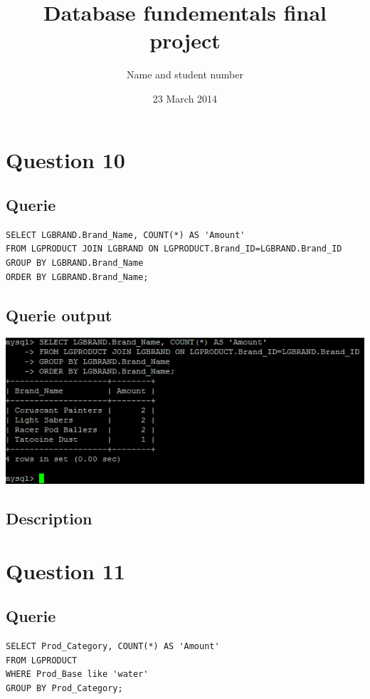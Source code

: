\documentclass[a4paper,10pt]{article}
\title{Database fundementals final project}
\author{Name and student number}
\date{23 March 2014}
\begin{document}
\begin{titlepage}
\maketitle
\end{titlepage}
\tableofcontents{}
\newpage
\thispagestyle{empty}
\mbox{}\section*{Question 10}
 \subsection{Querie}
          \lstset{
            language=SQL,
            breaklines=true
            }
        \begin{lstlisting}[frame=single]
        SELECT LGBRAND.Brand_Name, COUNT(*) AS 'Amount'
FROM LGPRODUCT JOIN LGBRAND ON LGPRODUCT.Brand_ID=LGBRAND.Brand_ID
GROUP BY LGBRAND.Brand_Name
ORDER BY LGBRAND.Brand_Name;

        \end{lstlisting}
\subsection{Querie output}
           \includegraphics{Queries/Question_10/Question_10_screenshot.PNG}
\subsection{Description}\section*{Question 11}
 \subsection{Querie}
          \lstset{
            language=SQL,
            breaklines=true
            }
        \begin{lstlisting}[frame=single]
        SELECT Prod_Category, COUNT(*) AS 'Amount'
FROM LGPRODUCT
WHERE Prod_Base like 'water'
GROUP BY Prod_Category;

        \end{lstlisting}
\end{document}

